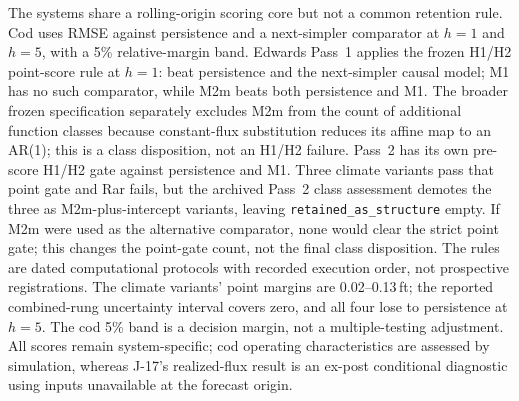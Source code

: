 \documentclass[preprint,11pt,authoryear]{elsarticle}
\theoremstyle{definition}
\theoremstyle{remark}
\begin{document}
The systems share a rolling-origin scoring core but not a common retention rule. Cod uses RMSE against persistence and a next-simpler comparator at $h=1$ and $h=5$, with a 5\% relative-margin band. Edwards Pass~1 applies the frozen H1/H2 point-score rule at $h=1$: beat persistence and the next-simpler causal model; M1 has no such comparator, while M2m beats both persistence and M1. The broader frozen specification separately excludes M2m from the count of additional function classes because constant-flux substitution reduces its affine map to an AR(1); this is a class disposition, not an H1/H2 failure. Pass~2 has its own pre-score H1/H2 gate against persistence and M1. Three climate variants pass that point gate and Rar fails, but the archived Pass~2 class assessment demotes the three as M2m-plus-intercept variants, leaving \texttt{retained\_as\_structure} empty. If M2m were used as the alternative comparator, none would clear the strict point gate; this changes the point-gate count, not the final class disposition. The rules are dated computational protocols with recorded execution order, not prospective registrations. The climate variants' point margins are 0.02--0.13\,ft; the reported combined-rung uncertainty interval covers zero, and all four lose to persistence at $h=5$. The cod 5\% band is a decision margin, not a multiple-testing adjustment. All scores remain system-specific; cod operating characteristics are assessed by simulation, whereas J-17's realized-flux result is an ex-post conditional diagnostic using inputs unavailable at the forecast origin.
\end{document}
